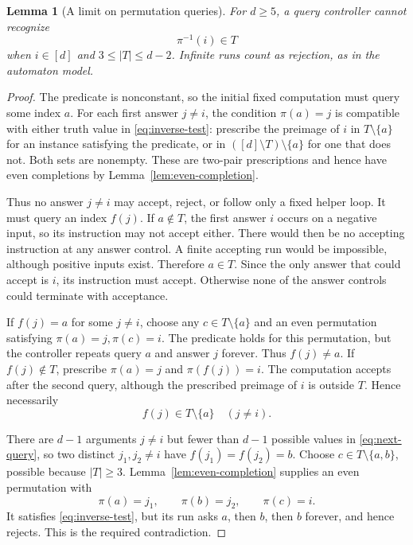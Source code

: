 \documentclass[11pt,a4paper]{article}
\newtheorem{lemma}[theorem]{Lemma}
\theoremstyle{definition}
\theoremstyle{remark}
\begin{document}
\begin{lemma}[A limit on permutation queries]\label{lem:inverse-obstruction}
For $d\ge5$, a query controller cannot recognize
\begin{equation}\label{eq:inverse-test}
                            \pi^{-1}(i)\in T
\end{equation}
when $i\in[d]$ and $3\le|T|\le d-2$. Infinite runs count as
rejection, as in the automaton model.
\end{lemma}
\begin{proof}
The predicate is nonconstant, so the initial fixed computation must
query some index $a$. For each first answer $j\ne i$, the condition
$\pi(a)=j$ is compatible with either truth value in \eqref{eq:inverse-test}: prescribe
the preimage of $i$ in $T\setminus\{a\}$ for an instance satisfying the predicate,
or in $([d]\setminus T)\setminus\{a\}$ for one that does not.
Both sets are nonempty. These are two-pair prescriptions and hence
have even completions by Lemma~\ref{lem:even-completion}.

Thus no answer $j\ne i$ may accept, reject, or follow only a fixed
helper loop. It must query an index $f(j)$. If $a\notin T$, the
first answer $i$ occurs on a negative input, so its instruction may
not accept either. There would then be no accepting instruction at
any answer control. A finite accepting run would be impossible,
although positive inputs exist. Therefore $a\in T$. Since the
only answer that could accept is $i$, its instruction must accept.
Otherwise none of the answer controls could terminate with acceptance.

If $f(j)=a$ for some $j\ne i$, choose any $c\in T\setminus\{a\}$
and an even permutation satisfying $\pi(a)=j,\pi(c)=i$.
The predicate holds for this permutation, but the controller repeats
query $a$ and answer $j$ forever. Thus $f(j)\ne a$. If $f(j)\notin T$, prescribe
$\pi(a)=j$ and $\pi(f(j))=i$. The computation accepts after the
second query, although the prescribed preimage of $i$ is outside
$T$. Hence necessarily
\begin{equation}\label{eq:next-query}
                         f(j)\in T\setminus\{a\}
                              \quad(j\ne i).
\end{equation}

There are $d-1$ arguments $j\ne i$ but fewer than $d-1$ possible
values in \eqref{eq:next-query}, so two distinct $j_1,j_2\ne i$ have
$f(j_1)=f(j_2)=b$. Choose $c\in T\setminus\{a,b\}$, possible
because $|T|\ge3$. Lemma~\ref{lem:even-completion} supplies an even
permutation with
\[
                    \pi(a)=j_1,\qquad\pi(b)=j_2,\qquad\pi(c)=i.
\]
It satisfies \eqref{eq:inverse-test}, but its run asks $a$, then $b$, then $b$
forever, and hence rejects. This is the required contradiction.
\end{proof}
\end{document}
